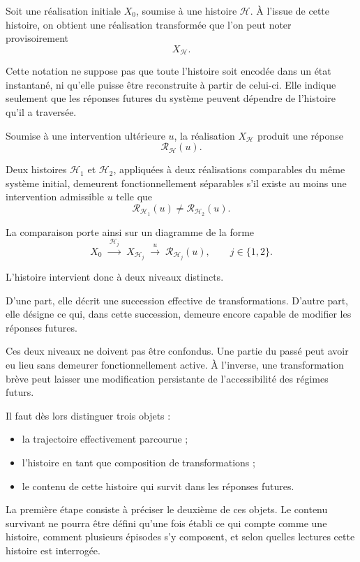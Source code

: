 Soit une réalisation initiale $X_0$, soumise à une histoire $\mathcal H$. À l'issue de cette histoire, on obtient une réalisation transformée que l'on peut noter provisoirement
\[
X_{\mathcal H}.
\]

Cette notation ne suppose pas que toute l'histoire soit encodée dans un état instantané, ni qu'elle puisse être reconstruite à partir de celui-ci. Elle indique seulement que les réponses futures du système peuvent dépendre de l'histoire qu'il a traversée.

Soumise à une intervention ultérieure $u$, la réalisation
$X_{\mathcal H}$ produit une réponse
\[
\mathcal R_{\mathcal H}(u).
\]

Deux histoires $\mathcal H_1$ et $\mathcal H_2$, appliquées à deux réalisations comparables du même système initial, demeurent fonctionnellement séparables s'il existe au moins une intervention admissible $u$ telle que
\[
\mathcal R_{\mathcal H_1}(u)
\neq
\mathcal R_{\mathcal H_2}(u).
\]

La comparaison porte ainsi sur un diagramme de la forme
\[
X_0
\;\xrightarrow{\;\mathcal H_j\;}\;
X_{\mathcal H_j}
\;\xrightarrow{\;u\;}\;
\mathcal R_{\mathcal H_j}(u),
\qquad j\in\{1,2\}.
\]

L'histoire intervient donc à deux niveaux distincts.

D'une part, elle décrit une succession effective de transformations. D'autre part, elle désigne ce qui, dans cette succession, demeure encore capable de modifier les réponses futures.

Ces deux niveaux ne doivent pas être confondus. Une partie du passé peut avoir eu lieu sans demeurer fonctionnellement active. À l'inverse, une transformation brève peut laisser une modification persistante de l'accessibilité des régimes futurs.

Il faut dès lors distinguer trois objets :

\begin{itemize}
\tightlist
\item
  la trajectoire effectivement parcourue ;
\item
  l'histoire en tant que composition de transformations ;
\item
  le contenu de cette histoire qui survit dans les réponses futures.
\end{itemize}

La première étape consiste à préciser le deuxième de ces objets. Le contenu survivant ne pourra être défini qu'une fois établi ce qui compte comme une histoire, comment plusieurs épisodes s'y composent, et selon quelles lectures cette histoire est interrogée.

